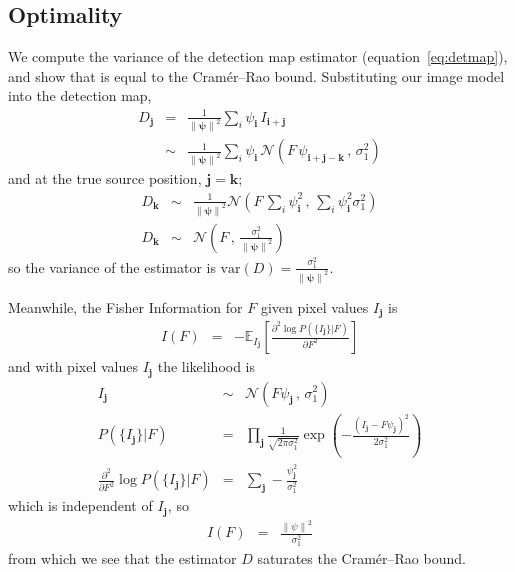 \documentclass[11pt,letterpaper,linenumbers]{aastex7}
\newcommand{\equationname}{equation}
\newcommand{\eqnref}[1]{\mbox{\equationname~\ref{#1}}}
\newcommand{\drawnfrom}{\sim}
\newcommand{\gaussianN}{\mathcal{N}}
\newcommand{\gaussx}[2]{\gaussianN\!\left(#1 \, , \, #2\right)}
\newcommand{\psf}{\psi}
\newcommand{\psfat}[1]{\psf_{#1}}
\newcommand{\psfnorm}{\norm{\bm{\psf}}}
\newcommand{\norm}[1]{\left\lVert #1 \right\rVert}
\newcommand{\var}[1]{\mathrm{var}\left( #1 \right)}
\renewcommand{\vec}[1]{\boldsymbol{#1}}
\newcommand{\ivec}{\vec{i}}
\newcommand{\jvec}{\vec{j}}
\newcommand{\kvec}{\vec{k}}
\begin{document}
\subsection{Optimality}
\label{sec:optsingle}

We compute the variance of the detection map estimator
(\eqnref{eq:detmap}), and show that is equal to the Cram\'er--Rao
bound.  Substituting our image model into the detection map,
\begin{eqnarray}
D_{\jvec} &=& \frac{1}{\psfnorm^2} \sum_{i} \psfat{\ivec} \,
I_{\ivec + \jvec}
\\
& \drawnfrom & \frac{1}{\psfnorm^2} \sum_{i} \psfat{\ivec} \,
\gaussx{F \, \psfat{\ivec + \jvec - \kvec}}{\sigma_1^2}
\end{eqnarray}
and at the true source position, $\jvec = \kvec$;
\begin{eqnarray}
%
D_{\kvec} &\drawnfrom& \frac{1}{\psfnorm^2} \gaussx%
{F \, \sum_{i} \psfat{\ivec}^2}%
{\sum_{i} \psfat{\ivec}^2 \sigma_1^2}
\\
D_{\kvec} &\drawnfrom& \gaussx%
{F}{\frac{\sigma_1^2}{\psfnorm^2}}
\end{eqnarray}
so the variance of the estimator is $\var{D} = \frac{\sigma_1^2}{\psfnorm^2}$.

Meanwhile, the Fisher Information for $F$ given pixel values $I_{\jvec}$ is
\begin{eqnarray}
  I(F) &=& -\mathbb{E}_{I_{\jvec}} \left[ \frac{\partial^2 \log P(\{ I_{\jvec} \} | F)}{\partial F^2} \right]
\end{eqnarray}
and with pixel values $I_{\jvec}$ the likelihood is
\begin{eqnarray}
  I_{\jvec} &\drawnfrom& \gaussx{F \psf_{\jvec}}{\sigma_1^2} \\
  P(\{ I_{\jvec} \} | F) &=& \prod_{\jvec} \frac{1}{\sqrt{2 \pi \sigma_1^2}} \exp \left( -\frac{(I_{\jvec} - F \psf_{\jvec})^2}{2 \sigma_1^2} \right) \\
  \frac{\partial^2}{\partial F^2} \log P(\{ I_{\jvec} \} | F) &=& \sum_{\jvec} -\frac{\psf_{\jvec}^2}{\sigma_1^2}
\end{eqnarray}
which is independent of $I_{\jvec}$, so
\begin{eqnarray}
  I(F) &=& \frac{\norm{\psf}^2}{\sigma_1^2}
\end{eqnarray}
from which we see that the estimator $D$ saturates the Cram\'er--Rao bound.
\end{document}
